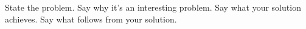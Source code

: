 
State the problem. %
Say why it’s an interesting problem. %
Say what your solution achieves. %
Say what follows from your solution. %


